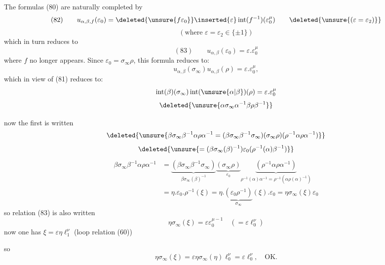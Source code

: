 The formulas (80) are naturally completed by
\[
(82)\qquad
u_{\alpha,\beta,f}(\varepsilon_0)
=\deleted{\unsure{f\varepsilon_0}}\inserted{\varepsilon}\operatorname{int}(f^{-1})(\varepsilon_0^\mu)
\qquad\deleted{\unsure{(\varepsilon=\varepsilon_2)}}
\]
\[
(\text{where }\varepsilon=\varepsilon_2\in\{\pm1\})
\]
which in turn reduces to
\[
(83)\qquad u_{\alpha,\beta}(\varepsilon_0)=\varepsilon.\varepsilon_0^\mu
\]
where $f$ no longer appears. Since $\varepsilon_0=\sigma_\infty\rho$, this formula reduces to:
\[
u_{\alpha,\beta}(\sigma_\infty)u_{\alpha,\beta}(\rho)=\varepsilon.\varepsilon_0^\mu,
\]
which in view of (81) reduces to:
\[
\operatorname{int}(\beta)(\sigma_\infty)\operatorname{int}(\unsure{\alpha|\beta})(\rho)=\varepsilon.\varepsilon_0^\mu
\]
\[
\deleted{\unsure{\alpha\sigma_\infty\alpha^{-1}\beta\rho\beta^{-1}}}
\]


now the first  is written
\[
\deleted{\unsure{\beta\sigma_\infty\beta^{-1}\alpha\rho\alpha^{-1}
=(\beta\sigma_\infty\beta^{-1}\sigma_\infty)(\sigma_\infty\rho)(\rho^{-1}\alpha\rho\alpha^{-1})}}
\]
\[
\deleted{\unsure{=(\beta\sigma_\infty(\beta)^{-1})\varepsilon_0(\rho^{-1}(\alpha)\beta^{-1})}}
\]
\[
\begin{aligned}
\beta\sigma_\infty\beta^{-1}\alpha\rho\alpha^{-1}
&=\underbrace{(\beta\sigma_\infty\beta^{-1}\sigma_\infty)}_{\beta\sigma_\infty(\beta)^{-1}}
\underbrace{(\sigma_\infty\rho)}_{\varepsilon_0}
\underbrace{(\rho^{-1}\alpha\rho\alpha^{-1})}_{\rho^{-1}(\alpha)\alpha^{-1}=\rho^{-1}(\alpha\rho(\alpha)^{-1})}\\
&=\eta.\varepsilon_0.\rho^{-1}(\xi)
=\eta.\underbrace{(\varepsilon_0\rho^{-1})}_{\sigma_\infty}(\xi).\varepsilon_0
=\eta\sigma_\infty(\xi)\varepsilon_0
\end{aligned}
\]
so relation (83) is also written
\[
\eta\sigma_\infty(\xi)=\varepsilon\varepsilon_0^{\mu-1}\quad(=\varepsilon \ell_0^\nu)
\]
now one has $\xi=\varepsilon\eta \ell_1^\nu$ (loop relation (60))

so
\[
\eta\sigma_\infty(\xi)=\varepsilon\eta\sigma_\infty(\eta)\ell_0^\nu=\varepsilon \ell_0^\nu,\quad\text{OK.}
\]

